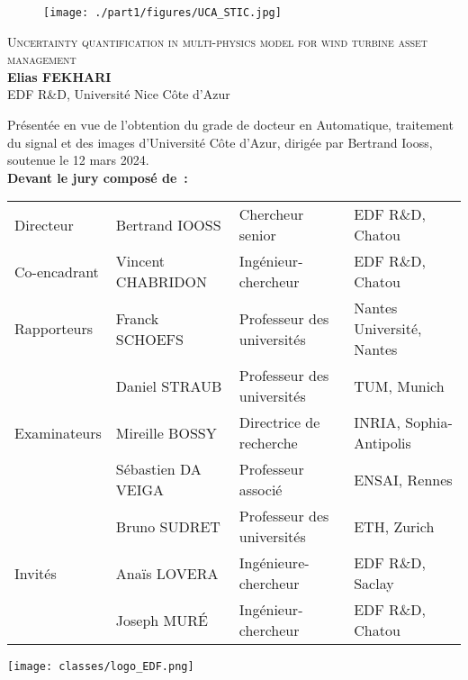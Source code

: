 {\pagestyle{plain}
\begin{figure}[t]
    \vspace*{-2.7cm}
    \begin{adjustwidth}{-28mm}{-21mm}
      \texttt{[image: ./part1/figures/UCA\_STIC.jpg]}
    \end{adjustwidth}
  \end{figure} 

\begin{adjustwidth}{-8mm}{-8mm}
\begin{center}
  {
  {\Huge \scshape{Uncertainty quantification in multi-physics model for wind turbine asset management}}\\[20pt]
  {\Large \textbf{Elias FEKHARI}}}\\
  {\large EDF R\&D, Université Nice Côte d'Azur\\[20pt]}
\end{center}
%
\vfill
\noindent
Présentée en vue de l’obtention du grade de docteur en Automatique, traitement du signal et des images 
d’Université Côte d’Azur, dirigée par Bertrand Iooss, soutenue le 12 mars 2024.\\

\noindent
\textbf{Devant le jury composé de~:}\\
\begin{tabular}{llll}
  Directeur       & Bertrand IOOSS      & Chercheur senior & EDF R\&D, Chatou \\
  Co-encadrant    & Vincent CHABRIDON   & Ingénieur-chercheur        & EDF R\&D, Chatou \\
  Rapporteurs     & Franck SCHOEFS      & Professeur des universités & Nantes Université, Nantes\\
                  & Daniel STRAUB       & Professeur des universités & TUM, Munich\\
  Examinateurs    & Mireille BOSSY      & Directrice de recherche    & INRIA, Sophia-Antipolis\\
                  & Sébastien DA VEIGA  & Professeur associé         & ENSAI, Rennes\\
                  & Bruno SUDRET        & Professeur des universités & ETH, Zurich \\ 
  Invités         & Ana\"is LOVERA      & Ingénieure-chercheur       & EDF R\&D, Saclay\\
                  & Joseph MUR\'E       & Ingénieur-chercheur        & EDF R\&D, Chatou \\
\end{tabular}
\end{adjustwidth}

\vfill
\begin{center}
  \texttt{[image: classes/logo\_EDF.png]}
\end{center}
}